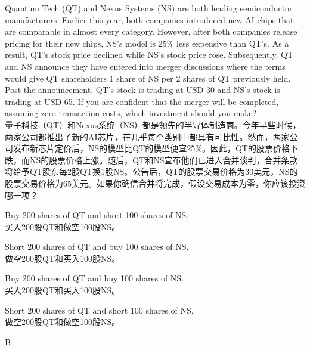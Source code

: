 \documentclass{article}
\newcounter{question} %
\begin{document}
\begin{question}
    Quantum Tech (QT) and Nexus Systems (NS) are both leading semiconductor manufacturers. Earlier this year, both companies introduced new AI chips that are comparable in almost every category. However, after both companies release pricing for their new chips, NS's model is 25\% less expensive than QT's. As a result, QT's stock price declined while NS's stock price rose. Subsequently, QT and NS announce they have entered into merger discussions where the terms would give QT shareholders 1 share of NS per 2 shares of QT previously held. Post the announcement, QT's stock is trading at USD 30 and NS's stock is trading at USD 65. If you are confident that the merger will be completed, assuming zero transaction costs, which investment should you make?
    \\量子科技（QT）和Nexus系统（NS）都是领先的半导体制造商。今年早些时候，两家公司都推出了新的AI芯片，在几乎每个类别中都具有可比性。然而，两家公司发布新芯片定价后，NS的模型比QT的模型便宜25\%。因此，QT的股票价格下跌，而NS的股票价格上涨。随后，QT和NS宣布他们已进入合并谈判，合并条款将给予QT股东每2股QT换1股NS。公告后，QT的股票交易价格为30美元，NS的股票交易价格为65美元。如果你确信合并将完成，假设交易成本为零，你应该投资哪一项？
\end{question}

\begin{choices}
    \item Buy 200 shares of QT and short 100 shares of NS.\\买入200股QT和做空100股NS。
    \item Short 200 shares of QT and buy 100 shares of NS.\\做空200股QT和买入100股NS。
    \item Buy 200 shares of QT and buy 100 shares of NS.\\买入200股QT和买入100股NS。
    \item Short 200 shares of QT and short 100 shares of NS.\\做空200股QT和做空100股NS。
\end{choices}

\begin{correctanswer}
    B
\end{correctanswer}
\end{document}
